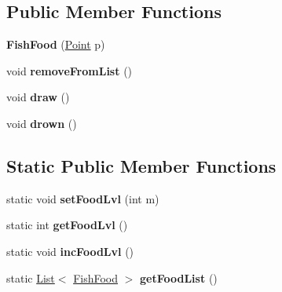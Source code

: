 \subsection*{Public Member Functions}
\begin{DoxyCompactItemize}
\item 
\mbox{\label{class_fish_food_a3e8f3c93069e4c6163dbebca2f424adc}} 
{\bfseries Fish\+Food} (\mbox{\hyperlink{class_point}{Point}} p)
\item 
\mbox{\label{class_fish_food_ab9d6c0fc07ed3ceb8fe31fbfee793bb3}} 
void {\bfseries remove\+From\+List} ()
\item 
\mbox{\label{class_fish_food_ac17f2587b9690da0d515cfa91dea6f5a}} 
void {\bfseries draw} ()
\item 
\mbox{\label{class_fish_food_a5cdba669dec2af75a0887801f907cc2d}} 
void {\bfseries drown} ()
\end{DoxyCompactItemize}
\subsection*{Static Public Member Functions}
\begin{DoxyCompactItemize}
\item 
\mbox{\label{class_fish_food_a68c2d09a1c230c6923c2fe61a50a877e}} 
static void {\bfseries set\+Food\+Lvl} (int m)
\item 
\mbox{\label{class_fish_food_a20b3d2c4fe40c1999cbd1a1339808fb3}} 
static int {\bfseries get\+Food\+Lvl} ()
\item 
\mbox{\label{class_fish_food_ab0d24aa0e13cd6a2b5446e223ac09774}} 
static void {\bfseries inc\+Food\+Lvl} ()
\item 
\mbox{\label{class_fish_food_aa322ac4cedaa7dff4c2a14918bf23948}} 
static \mbox{\hyperlink{class_list}{List}}$<$ \mbox{\hyperlink{class_fish_food}{Fish\+Food}} $>$ {\bfseries get\+Food\+List} ()
\end{DoxyCompactItemize}
